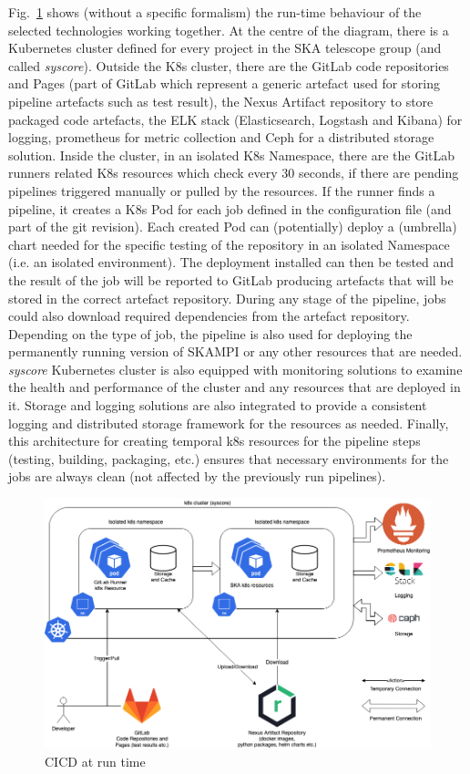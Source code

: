 \documentclass[a4paper,
               keeplastbox,   %
               ]{jacow}
\begin{document}
Fig.~\ref{fig:cicdruntime} shows (without a specific formalism) the run-time behaviour of the selected technologies working together. At the centre of the diagram, there is a Kubernetes cluster defined for every project in the SKA telescope group (and called \textit{syscore}). Outside the K8s cluster, there are the GitLab code repositories and Pages\cite{gitlab} (part of GitLab which represent a generic artefact used for storing pipeline artefacts such as test result), the Nexus Artifact repository\cite{nexus} to store packaged code artefacts, the ELK stack (Elasticsearch, Logstash and Kibana)\cite{elastcsearch} for logging, prometheus\cite{prometheus} for metric collection and Ceph\cite{ceph} for a distributed storage solution.
Inside the cluster, in an isolated K8s Namespace, there are the GitLab runners related K8s resources which check every 30 seconds, if there are pending pipelines triggered manually or pulled by the resources. If the runner finds a pipeline, it creates a K8s Pod for each job defined in the configuration file (and part of the git revision). Each created Pod can (potentially) deploy a (umbrella) chart needed for the specific testing of the repository in an isolated Namespace (i.e. an isolated environment). The deployment installed can then be tested and the result of the job will be reported to GitLab producing artefacts that will be stored in the correct artefact repository. During any stage of the pipeline, jobs could also download required dependencies from the artefact repository. Depending on the type of job, the pipeline is also used for deploying the permanently running version of SKAMPI or any other resources that are needed. \textit{syscore} Kubernetes cluster is also equipped with monitoring solutions to examine the health and performance of the cluster and any resources that are deployed in it. Storage and logging solutions are also integrated to provide a consistent logging and distributed storage framework for the resources as needed. Finally, this architecture for creating temporal k8s resources for the pipeline steps (testing, building, packaging, etc.) ensures that necessary environments for the jobs are always clean (not affected by the previously run pipelines).

\begin{figure}[!htb]
   \centering
   \includegraphics*[width=0.8\columnwidth]{cicdruntime-v2}
   \caption{CICD at run time}
   \label{fig:cicdruntime}
\end{figure}
\end{document}
